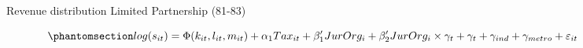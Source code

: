 \documentclass[
  12pt]{article}
\begin{document}
\begin{figure}

\caption{\label{fig-revenue-hist-bunch-1}Revenue distribution Limited
Partnership (81-83)}


\end{figure}%

\begin{equation}\phantomsection\label{eq-reg-tax-jo}{
log(s_{it})= \Phi(k_{it},l_{it},m_{it})+ \alpha_1Tax_{it}+\mathbf{\beta}_1'JurOrg_i + \beta_2'JurOrg_i\times\gamma_t+ \gamma_t + \gamma_{ind} +\gamma_{metro} + \varepsilon_{it}
}\end{equation}
\end{document}

